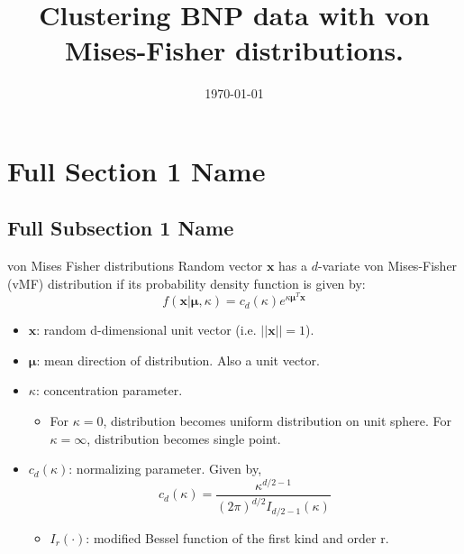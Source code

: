 \documentclass[
]{beamer}
\title[Short Presentation Title]{Clustering BNP data with von Mises-Fisher distributions.}
\date{\today}
\begin{document}
\begin{frame}[plain]
\maketitle
\end{frame}

\section[Short Section 1 Name]{Full Section 1 Name}
\subsection[Short Subsection 1 Name]{Full Subsection 1 Name}

\begin{frame}{von Mises Fisher distributions}%
Random vector $\boldsymbol{x}$ has a $d$-variate von Mises-Fisher (vMF) distribution if its probability density function is given by:
$$f(\boldsymbol{x}|\boldsymbol{\mu}, \kappa) = c_d(\kappa)e^{\kappa\boldsymbol{\mu}^T\mathbf{x}}$$
\begin{itemize}
  \item $\boldsymbol{x}$: random d-dimensional unit vector (i.e. $||\boldsymbol{x}|| = 1$).
  \item $\boldsymbol{\mu}$: mean direction of distribution. Also a unit vector.
  \item $\kappa$: concentration parameter.
  \begin{itemize}
    \item For $\kappa = 0$, distribution becomes uniform distribution on unit sphere. For $\kappa = \infty$, distribution becomes single point.
  \end{itemize}
  \item $c_d(\kappa)$: normalizing parameter. Given by,
  $$c_d(\kappa) = \frac{\kappa^{d/2-1}}{(2\pi)^{d/2}I_{d/2-1}(\kappa)}$$
  \begin{itemize}
      \item $I_r(\cdot)$: modified Bessel function of the first kind and order r.
  \end{itemize}
\end{itemize}
\end{frame}

\end{document}
